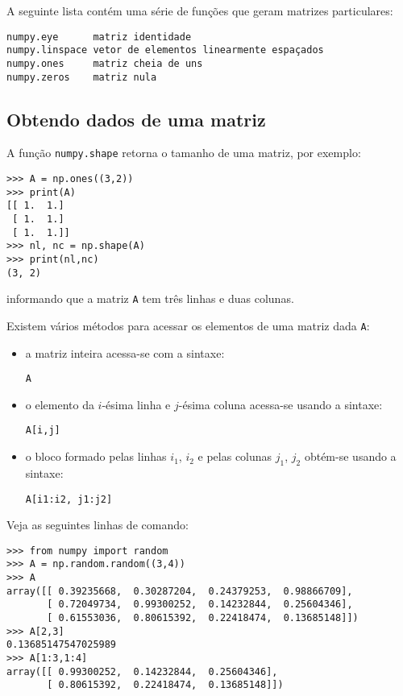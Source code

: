 A seguinte lista contém uma série de funções que geram matrizes particulares:
\begin{verbatim}
numpy.eye      matriz identidade
numpy.linspace vetor de elementos linearmente espaçados
numpy.ones     matriz cheia de uns
numpy.zeros    matriz nula
\end{verbatim}

\subsection{Obtendo dados de uma matriz}

A função \verb+numpy.shape+ retorna o tamanho de uma matriz, por exemplo:
\begin{verbatim}
>>> A = np.ones((3,2))
>>> print(A)
[[ 1.  1.]
 [ 1.  1.]
 [ 1.  1.]]
>>> nl, nc = np.shape(A)
>>> print(nl,nc)
(3, 2)
\end{verbatim}
informando que a matriz \verb+A+ tem três linhas e duas colunas.

Existem vários métodos para acessar os elementos de uma matriz dada \verb+A+:
\begin{itemize}
\item a matriz inteira acessa-se com a sintaxe:
\begin{verbatim}
A
\end{verbatim}
\item o elemento da $i$-ésima linha e $j$-ésima coluna acessa-se usando a sintaxe:
\begin{verbatim}
A[i,j]
\end{verbatim}
\item o bloco formado pelas linhas $i_1$, $i_2$ e pelas colunas $j_1$, $j_2$ obtém-se usando a sintaxe:
\begin{verbatim}
A[i1:i2, j1:j2]
\end{verbatim}
\end{itemize}

\begin{ex}
  Veja as seguintes linhas de comando:
\begin{verbatim}
>>> from numpy import random
>>> A = np.random.random((3,4))
>>> A
array([[ 0.39235668,  0.30287204,  0.24379253,  0.98866709],
       [ 0.72049734,  0.99300252,  0.14232844,  0.25604346],
       [ 0.61553036,  0.80615392,  0.22418474,  0.13685148]])
>>> A[2,3]
0.13685147547025989
>>> A[1:3,1:4]
array([[ 0.99300252,  0.14232844,  0.25604346],
       [ 0.80615392,  0.22418474,  0.13685148]])
\end{verbatim}
\end{ex}

